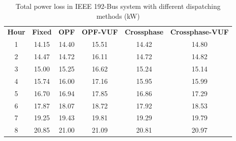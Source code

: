 \documentclass[journal]{IEEEtran}
\begin{document}
\begin{center}
\begin{table}
\caption{Total power loss in IEEE 192-Bus system with different dispatching methods (kW)}
\label{Table6}
\centering

\begin{tabular}{c|c|c|c|c|c}
    \hline\hline
    \multirow{2}[0]{*}{\textbf{Hour}} &  \multirow{2}[0]{*}{\textbf{Fixed}} & \multirow{2}[0]{*}{\textbf{OPF}} & \multirow{2}[0]{*}{\textbf{OPF-VUF}} & \multirow{2}[0]{*}{\textbf{Crossphase}} & \multirow{2}[0]{5em}{\textbf{Crossphase-VUF}} \\ & & & & & \\ \hline
    1 & 14.15 & 14.40 & 15.51 & 14.42 & 14.80\\ 
    \hline
    2 & 14.47 & 14.72 & 16.11 & 14.72 & 14.82\\ 
    \hline
    3 & 15.00 & 15.25 & 16.62 & 15.24 & 15.14\\ 
    \hline
    4 & 15.74 & 16.00 & 17.16 & 15.95 & 15.99\\ 
    \hline
    5 & 16.70 & 16.94 & 17.85 & 16.86 & 17.29\\ 
    \hline
    6 & 17.87 & 18.07 & 18.72 & 17.92 & 18.53\\ 
    \hline
    7 & 19.25 & 19.43 & 19.81 & 19.29 & 19.79\\ 
    \hline
    8 & 20.85 & 21.00 & 21.09 & 20.81 & 20.97\\ 
    \hline\hline
    \end{tabular}

\end{table}
\end{center}


\end{document}
